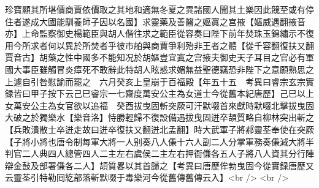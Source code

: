 珍寶顯其所堪價商賈依價取之其地和適無冬夏之異諸國人聞其土樂因此競至或有停住者遂成大國能馴養師子因以名國】求靈藥及善醫之嫗寘之宫掖【嫗威遇翻掖音亦】上命監察御史楊範臣與胡人偕往求之範臣從容奏曰陛下前年焚珠玉錦繡示不復用今所求者何以異於所焚者乎彼市舶與商賈爭利殆非王者之體【從千容翻復扶又翻賈音古】胡藥之性中國多不能知况於胡嫗豈宜寘之宫掖夫御史天子耳目之官必有軍國大事臣雖觸冒炎瘴死不敢辭此特胡人眩惑求媚無益聖德竊恐非陛下之意願熟思之上遽自引咎慰諭而罷之　六月癸亥上皇崩于百福殿【年五十五　考異曰睿宗玄宗實録皆曰甲子按下云己巳睿宗一七齋度萬安公主為女道士今從舊本紀唐歷】己巳以上女萬安公主為女官欲以追福　癸酉拔曳固斬突厥可汗默啜首來獻時默啜北擊拔曳固大破之於獨樂水【樂音洛】恃勝輕歸不復設備遇拔曳固迸卒頡質略自柳林突出斬之【兵敗潰散士卒迸走故曰迸卒復扶又翻迸北孟翻】時大武軍子將郝靈荃奉使在突厥【子將小將也唐令制每軍大將一人别奏八人傔十六人副二人分掌軍務奏傔減大將半判官二人典四人總管四人二主左右虞侯二主左右押衙傔各五人子將八人資其分行陣辯金鼔及部署傔各二人】頡質畧以其首歸之【考異曰唐歷侔勃曳固今從實録唐歷又云靈荃引特勒囘紇部落斬默啜于毒樂河今從舊傳舊傳云入】<br />
<br />
